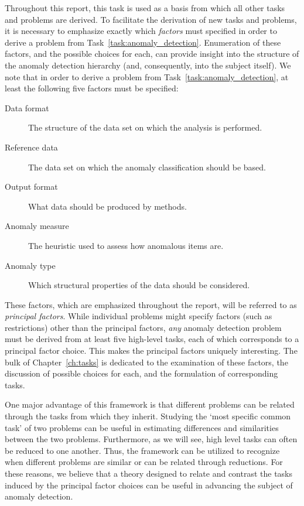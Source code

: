 Throughout this report, this task is used as a basis from which all other tasks and problems are derived. To facilitate the derivation of new tasks and problems, it is necessary to emphasize exactly which \emph{factors} must specified in order to derive a problem from Task~\ref{task:anomaly_detection}. Enumeration of these factors, and the possible choices for each, can provide insight into the structure of the anomaly detection hierarchy (and, consequently, into the subject itself). We note that in order to derive a problem from Task~\ref{task:anomaly_detection}, at least the following five factors must be specified:
\begin{description}
  \item[Data format] The structure of the data set on which the analysis is performed.
  \item[Reference data] The data set on which the anomaly classification should be based.
  \item[Output format] What data should be produced by methods.
  \item[Anomaly measure] The heuristic used to assess how anomalous items are.
  \item[Anomaly type] Which structural properties of the data should be considered.
\end{description}
These factors, which are emphasized throughout the report, will be referred to as \emph{principal factors}. While individual problems might specify factors (such as restrictions) other than the principal factors, \emph{any} anomaly detection problem must be derived from at least five high-level tasks, each of which corresponds to a principal factor choice. This makes the principal factors uniquely interesting. The bulk of Chapter~\ref{ch:tasks} is dedicated to the examination of these factors, the discussion of possible choices for each, and the formulation of corresponding tasks.

One major advantage of this framework is that different problems can be related through the tasks from which they inherit. Studying the `most specific common task' of two problems can be useful in estimating differences and similarities between the two problems. Furthermore, as we will see, high level tasks can often be reduced to one another. Thus, the framework can be utilized to recognize when different problems are similar or can be related through reductions. For these reasons, we believe that a theory designed to relate and contrast the tasks induced by the principal factor choices can be useful in advancing the subject of anomaly detection.

